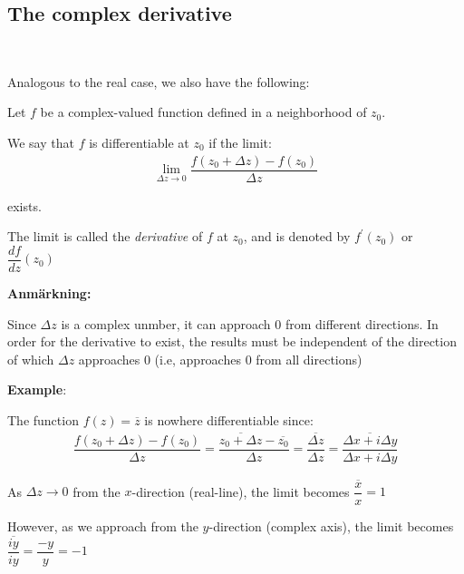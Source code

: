 \subsection{The complex derivative}\hfill\\\par
\noindent Analogous to the real case, we also have the following:
\par\bigskip
\begin{theo}[Differentiability]{}
  Let $f$ be a complex-valued function defined in a neighborhood of $z_0$.\par
  \noindent We say that $f$ is differentiable at $z_0$ if the limit:
  \begin{equation*}
    \begin{gathered}
      \lim_{\Delta z\to0}\dfrac{f(z_0+\Delta z)-f(z_0)}{\Delta z}
    \end{gathered}
  \end{equation*}\par
  \noindent exists.\par
  \noindent The limit is called the \textit{derivative} of $f$ at $z_0$, and is denoted by $f^{\prime}(z_0)$ or $\dfrac{df}{dz}(z_0)$
\end{theo}
\par\bigskip
\noindent\textbf{Anmärkning:}\par
\noindent Since $\Delta z$ is a complex unmber, it can approach $0$ from different directions. In order for the derivative to exist, the results must be independent of the direction of which $\Delta z$ approaches 0 (i.e, approaches 0 from all directions)
\par\bigskip
\noindent\textbf{Example}:\par
\noindent The function $f(z) = \overline{z}$ is nowhere differentiable since:
\begin{equation*}
  \begin{gathered}
    \dfrac{f(z_0+\Delta z)-f(z_0)}{\Delta z} = \dfrac{\overline{z_0+\Delta z}-\overline{z_0}}{\Delta z} = \dfrac{\overline{\Delta z}}{\Delta z} = \dfrac{\overline{\Delta x+i\Delta y}}{\Delta x+i\Delta y}
  \end{gathered}
\end{equation*}\par
\noindent As $\Delta z\to0$ from the $x$-direction (real-line), the limit becomes $\dfrac{\overline{x}}{x} = 1$\par
\noindent However, as we approach from the $y$-direction (complex axis), the limit becomes $\dfrac{\overline{iy}}{iy} = \dfrac{-y}{y} = -1$\par
